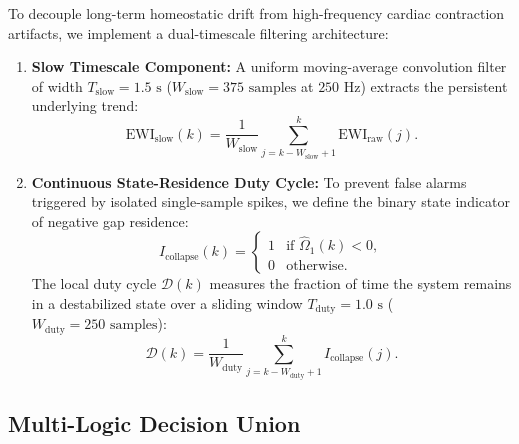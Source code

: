 \documentclass[11pt,a4paper]{article}
\begin{document}
To decouple long-term homeostatic drift from high-frequency cardiac contraction artifacts, we implement a dual-timescale filtering architecture:
\begin{enumerate}
    \item \textbf{Slow Timescale Component:} A uniform moving-average convolution filter of width $T_{\mathrm{slow}} = 1.5\text{ s}$ ($W_{\mathrm{slow}} = 375\text{ samples}$ at $250\text{ Hz}$) extracts the persistent underlying trend:
    \begin{equation}
    \mathrm{EWI}_{\mathrm{slow}}(k) = \frac{1}{W_{\mathrm{slow}}} \sum_{j = k - W_{\mathrm{slow}} + 1}^k \mathrm{EWI}_{\mathrm{raw}}(j).
    \end{equation}
    \item \textbf{Continuous State-Residence Duty Cycle:} To prevent false alarms triggered by isolated single-sample spikes, we define the binary state indicator of negative gap residence:
    \begin{equation}
    I_{\mathrm{collapse}}(k) = \begin{cases} 1 & \text{if } \hat{\Omega}_1(k) < 0, \\ 0 & \text{otherwise}. \end{cases}
    \end{equation}
    The local duty cycle $\mathcal{D}(k)$ measures the fraction of time the system remains in a destabilized state over a sliding window $T_{\mathrm{duty}} = 1.0\text{ s}$ ($W_{\mathrm{duty}} = 250\text{ samples}$):
    \begin{equation}
    \mathcal{D}(k) = \frac{1}{W_{\mathrm{duty}}} \sum_{j = k - W_{\mathrm{duty}} + 1}^k I_{\mathrm{collapse}}(j).
    \end{equation}
\end{enumerate}

\subsection{Multi-Logic Decision Union}
\end{document}
